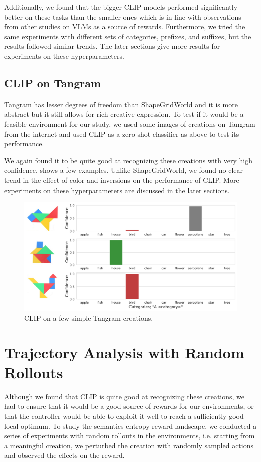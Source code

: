 Additionally, we found that the bigger CLIP models performed significantly better on these tasks than the smaller ones which is in line with observations from other studies on VLMs as a source of rewards.
Furthermore, we tried the same experiments with different sets of categories, prefixes, and suffixes, but the results followed similar trends.
The later sections give more results for experiments on these hyperparameters.


\subsection{CLIP on Tangram}
\label{sec:clip-tangram}

Tangram has lesser degrees of freedom than ShapeGridWorld and it is more abstract but it still allows for rich creative expression.
To test if it would be a feasible environment for our study, we used some images of creations on Tangram from the internet and used CLIP as a zero-shot classifier as above to test its performance.

We again found it to be quite good at recognizing these creations with very high confidence.
 shows a few examples.
Unlike ShapeGridWorld, we found no clear trend in the effect of color and inversions on the performance of CLIP.
More experiments on these hyperparameters are discussed in the later sections.

\begin{figure}[h]
    \centering
    \includegraphics[width=\textwidth]{images/tangram_comparison.png}
    \caption{CLIP on a few simple Tangram creations.}
    \label{fig:clip-tangram}
\end{figure}


\section{Trajectory Analysis with Random Rollouts}
\label{sec:clip-problems}
Although we found that CLIP is quite good at recognizing these creations, we had to ensure that it would be a good source of rewards for our environments, or that the controller would be able to exploit it well to reach a sufficiently good local optimum.
To study the semantics entropy reward landscape, we conducted a series of experiments with random rollouts in the environments, i.e. starting from a meaningful creation, we perturbed the creation with randomly sampled actions and observed the effects on the reward.

